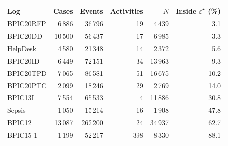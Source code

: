 \begin{tabular}{lrrrrr}
\toprule
Log & Cases & Events & Activities & $N$ & Inside $\varepsilon^\star$ (\%) \\
\midrule
BPIC20RFP & 6\,886 & 36\,796 & 19 & 4\,439 & 3.1 \\
BPIC20DD & 10\,500 & 56\,437 & 17 & 6\,985 & 3.3 \\
HelpDesk & 4\,580 & 21\,348 & 14 & 2\,372 & 5.6 \\
BPIC20ID & 6\,449 & 72\,151 & 34 & 13\,963 & 9.3 \\
BPIC20TPD & 7\,065 & 86\,581 & 51 & 16\,675 & 10.2 \\
BPIC20PTC & 2\,099 & 18\,246 & 29 & 2\,769 & 14.0 \\
BPIC13I & 7\,554 & 65\,533 & 4 & 11\,886 & 30.8 \\
Sepsis & 1\,050 & 15\,214 & 16 & 1\,908 & 47.8 \\
BPIC12 & 13\,087 & 262\,200 & 24 & 34\,937 & 62.7 \\
BPIC15-1 & 1\,199 & 52\,217 & 398 & 8\,330 & 88.1 \\
\bottomrule
\end{tabular}
